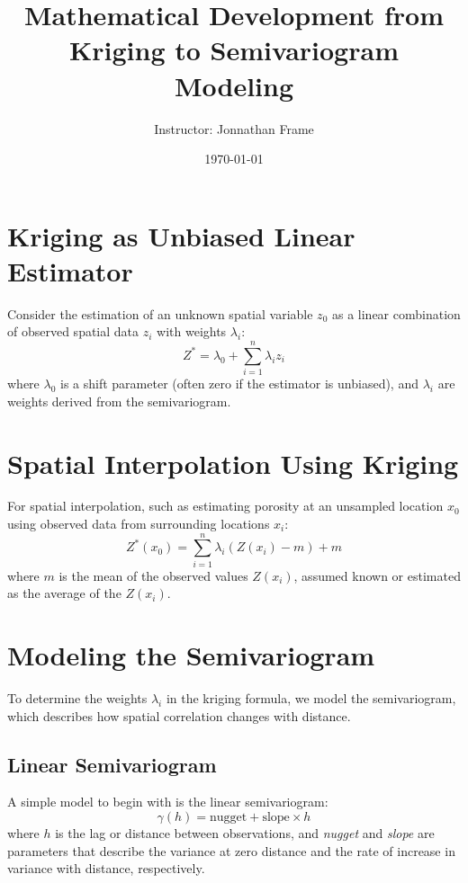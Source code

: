 \documentclass{article}
\begin{document}
\title{Mathematical Development from Kriging to Semivariogram Modeling}
\author{Instructor: Jonnathan Frame}
\date{\today}
\maketitle

\section{Kriging as Unbiased Linear Estimator}

Consider the estimation of an unknown spatial variable $z_0$ as a linear combination of observed spatial data $z_i$ with weights $\lambda_i$:
\[
Z^* = \lambda_0 + \sum_{i=1}^n \lambda_i z_i
\]
where $\lambda_0$ is a shift parameter (often zero if the estimator is unbiased), and $\lambda_i$ are weights derived from the semivariogram.

\section{Spatial Interpolation Using Kriging}
For spatial interpolation, such as estimating porosity at an unsampled location $x_0$ using observed data from surrounding locations $x_i$:
\[
Z^*(x_0) = \sum_{i=1}^n \lambda_i (Z(x_i) - m) + m
\]
where $m$ is the mean of the observed values $Z(x_i)$, assumed known or estimated as the average of the $Z(x_i)$.

\section{Modeling the Semivariogram}
To determine the weights $\lambda_i$ in the kriging formula, we model the semivariogram, which describes how spatial correlation changes with distance.

\subsection{Linear Semivariogram}
A simple model to begin with is the linear semivariogram:
\[
\gamma(h) = \text{nugget} + \text{slope} \times h
\]
where $h$ is the lag or distance between observations, and \textit{nugget} and \textit{slope} are parameters that describe the variance at zero distance and the rate of increase in variance with distance, respectively.
\end{document}
